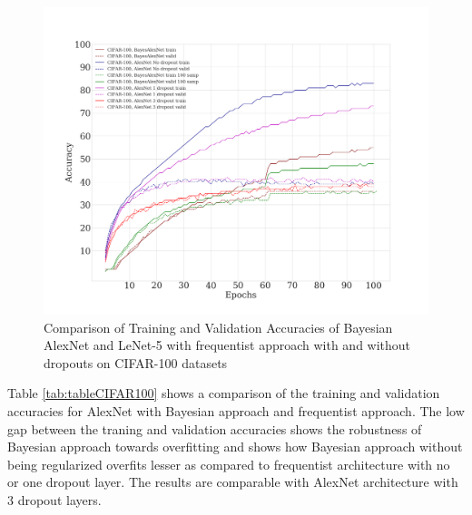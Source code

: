\begin{figure}[H] 
\begin{center}
\includegraphics[width=\linewidth]{Chapter5/Figs/results_train_test_cifar100.png}
\caption{Comparison of Training and Validation Accuracies of Bayesian AlexNet and LeNet-5 with frequentist approach with and without dropouts on CIFAR-100 datasets}
\label{fig:regularization}
\end{center}
\end{figure} 

Table \ref{tab:tableCIFAR100} shows a comparison of the training and validation accuracies for AlexNet with Bayesian approach and frequentist approach. The low gap between the traning and validation accuracies shows the robustness of Bayesian approach towards overfitting and shows how Bayesian approach without being regularized overfits lesser as compared to frequentist architecture with no or one dropout layer. The results are comparable with AlexNet architecture with 3 dropout layers.


